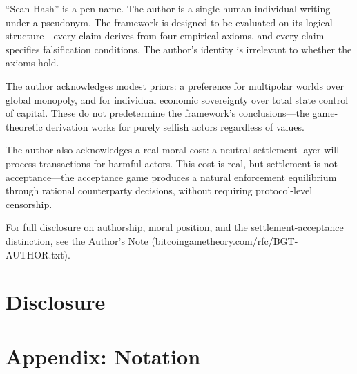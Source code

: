 \documentclass[12pt]{article}
\theoremstyle{definition}
\theoremstyle{remark}
\begin{document}
``Sean Hash'' is a pen name. The author is a single human individual
writing under a pseudonym. The framework is designed to be evaluated on
its logical structure---every claim derives from four empirical axioms,
and every claim specifies falsification conditions. The author's identity
is irrelevant to whether the axioms hold.

The author acknowledges modest priors: a preference for multipolar worlds
over global monopoly, and for individual economic sovereignty over total
state control of capital. These do not predetermine the framework's
conclusions---the game-theoretic derivation works for purely selfish
actors regardless of values.

The author also acknowledges a real moral cost: a neutral settlement layer
will process transactions for harmful actors. This cost is real, but
settlement is not acceptance---the acceptance game produces a natural
enforcement equilibrium through rational counterparty decisions, without
requiring protocol-level censorship.

For full disclosure on authorship, moral position, and the
settlement-acceptance distinction, see the Author's Note
(bitcoingametheory.com/rfc/BGT-AUTHOR.txt).

\section{Disclosure}\label{sec:disclosure}

\appendix
\section{Appendix: Notation}\label{app:notation}
\end{document}
